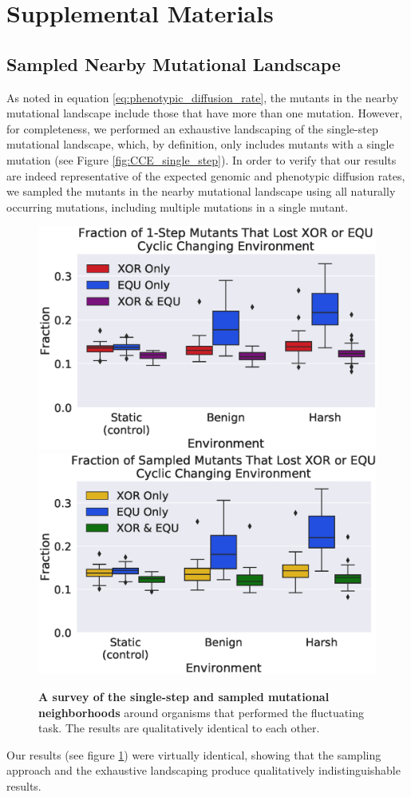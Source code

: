 \section*{Supplemental Materials}
\subsection*{Sampled Nearby Mutational Landscape}\label{ss:sampled_nearby}
As noted in equation \ref{eq:phenotypic_diffusion_rate}, the mutants in the nearby mutational landscape include those that have more than one mutation. However, for completeness, we performed an exhaustive landscaping of the single-step mutational landscape, which, by definition, only includes mutants with a single mutation (see Figure \ref{fig:CCE_single_step}). In order to verify that our results are indeed representative of the expected genomic and phenotypic diffusion rates, we sampled the mutants in the nearby mutational landscape using all naturally occurring mutations, including multiple mutations in a single mutant.

	\begin{figure}[!h] %
	\includegraphics[width=0.95\columnwidth]{figures/CE/fig10.eps}
    \includegraphics[width=0.95\columnwidth]{figures/CE/figA.eps}
	\caption{\textbf{A survey of the single-step and sampled mutational neighborhoods} around organisms that performed the fluctuating task. The results are qualitatively identical to each other.   
	}\label{fig:CCE_sample_step}
	\end{figure}

Our results (see figure \ref{fig:CCE_sample_step})  were virtually identical, showing that the sampling approach and the exhaustive landscaping produce qualitatively indistinguishable results.